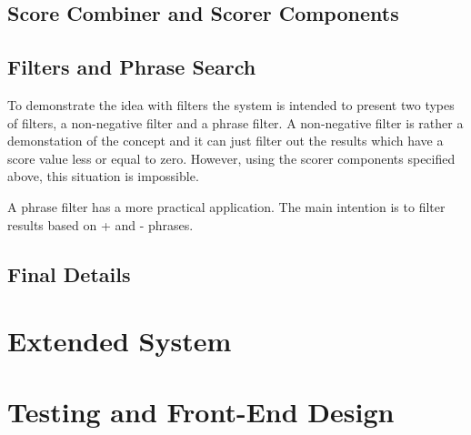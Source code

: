 \subsection{Score Combiner and Scorer Components}

\subsection{Filters and Phrase Search}
To demonstrate the idea with filters the system is intended to present two types of filters, a non-negative filter and a phrase filter. A non-negative filter is rather a demonstation of the concept and it can just filter out the results which have a score value less or equal to zero. However, using the scorer components specified above, this situation is impossible. 

A phrase filter has a more practical application. The main intention is to filter results based on + and - phrases.


\subsection{Final Details}

\section{Extended System}

\section{Testing and Front-End Design}

